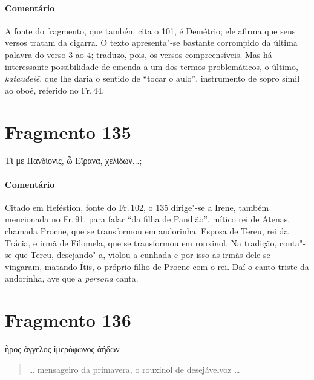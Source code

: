 \medskip

{\paragraph{Comentário} A fonte do fragmento, que também cita o 101, é Demétrio; ele afirma que seus versos tratam da cigarra. O texto apresenta"-se bastante corrompido da última palavra do verso 3 ao 4; traduzo, pois, os versos compreensíveis. Mas há interessante possibilidade de emenda a um dos termos problemáticos, o último, \emph{kataudeíē}, que lhe daria o sentido de ``tocar o aulo'', instrumento de sopro símil ao oboé, referido no Fr.\,44.}

\section{Fragmento 135}

\begin{gkverse}
Τί με Πανδίονις, ὦ Εἴρανα, χελίδων...;
\end{gkverse}

\begin{verse}
\end{verse}

\medskip

{\paragraph{Comentário} Citado em Heféstion, fonte do Fr.\,102, o 135 dirige"-se a Irene, também mencionada no Fr.\,91, para falar ``da filha de Pandião'', mítico rei de Atenas, chamada Procne, que se transformou em andorinha. Esposa de Tereu, rei da Trácia, e irmã de Filomela, que se transformou em rouxinol. Na tradição, conta"-se que Tereu, desejando"-a, violou a cunhada e por isso as irmãs dele se vingaram, matando Ítis, o próprio filho de Procne com o rei. Daí o canto triste da andorinha, ave que a \emph{persona} canta.}


\section{Fragmento 136}

\begin{gkverse}
ἦρος ἄγγελος ἰμερόφωνος ἀήδων
\end{gkverse}

\begin{verse}
\ldots{} mensageiro da primavera, o rouxinol de desejável\qb{}voz \ldots{}
\end{verse}

